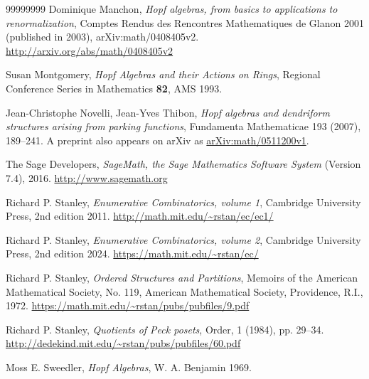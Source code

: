 \documentclass[numbers=enddot,12pt,final,onecolumn,notitlepage,abstracton]{scrartcl}
\theoremstyle{definition}
\begin{document}
\begin{thebibliography}{99999999}
Dominique Manchon, \textit{Hopf algebras, from
basics to applications to renormalization}, Comptes Rendus des Rencontres
Mathematiques de Glanon 2001 (published in 2003), arXiv:math/0408405v2.\newline%
\url{http://arxiv.org/abs/math/0408405v2}

Susan Montgomery, \textit{Hopf Algebras and their
Actions on Rings}, Regional Conference Series in Mathematics \textbf{82},
AMS 1993.

 Jean-Christophe Novelli, Jean-Yves Thibon,
\textit{Hopf algebras and dendriform structures arising from parking functions},
Fundamenta Mathematicae 193 (2007), 189--241. A preprint also appears
on arXiv as \href{http://arxiv.org/abs/math/0511200v1}{arXiv:math/0511200v1}.

The Sage Developers, \textit{SageMath,
the Sage Mathematics Software System} (Version 7.4), 2016.
\url{http://www.sagemath.org}

Richard P. Stanley, \textit{Enumerative
Combinatorics, volume 1}, Cambridge University Press, 2nd edition 2011.
\newline \url{http://math.mit.edu/~rstan/ec/ec1/}

Richard P. Stanley, \textit{Enumerative
Combinatorics, volume 2}, Cambridge University Press, 2nd edition 2024.
\newline \url{https://math.mit.edu/~rstan/ec/}

Richard P. Stanley, \textit{Ordered Structures and
Partitions}, Memoirs of the American Mathematical Society, No. 119, American
Mathematical Society, Providence, R.I., 1972. \newline
\url{https://math.mit.edu/~rstan/pubs/pubfiles/9.pdf}

Richard P. Stanley,
\textit{Quotients of Peck posets}, Order, 1 (1984), pp. 29--34. \newline
\url{http://dedekind.mit.edu/~rstan/pubs/pubfiles/60.pdf}

Moss E. Sweedler, \textit{Hopf Algebras},
W. A. Benjamin 1969.

\end{thebibliography}
\end{document}
